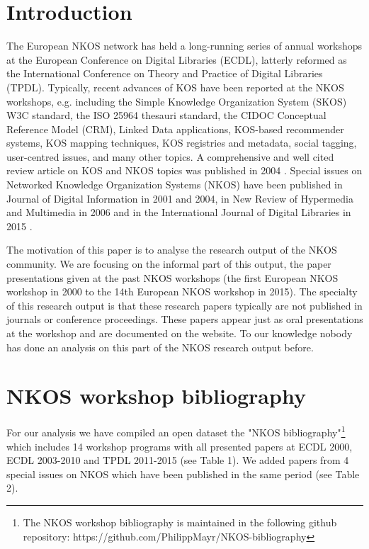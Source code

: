 \documentclass[runningheads,a4paper]{llncs}
\begin{document}
\section{Introduction}\label{intro}

The European NKOS network has held a long-running series of annual workshops at the European Conference on Digital Libraries (ECDL), latterly reformed as the International Conference on Theory and Practice of Digital Libraries (TPDL). 
Typically, recent advances of KOS have been reported at the NKOS workshops, e.g. including the Simple Knowledge Organization System (SKOS) W3C standard, the ISO 25964 thesauri standard, the CIDOC Conceptual Reference Model (CRM), Linked Data applications, KOS-based recommender systems, KOS mapping techniques, KOS registries and metadata, social tagging, user-centred issues, and many other topics. A comprehensive and well cited review article on KOS and NKOS topics was published in 2004 \cite{Zeng2004}. Special issues on Networked Knowledge Organization Systems (NKOS) have been published in Journal of Digital Information in 2001 and 2004, in New Review of Hypermedia and Multimedia in 2006 and in the International Journal of Digital Libraries in 2015 \cite{Mayr2016}. 

The motivation of this paper is to analyse the research output of the NKOS community. We are focusing on the informal part of this output, the paper presentations given at the past NKOS workshops (the first European NKOS workshop in 2000 to the 14th European NKOS workshop in 2015). The specialty of this research output is that these research papers typically are not published in journals or conference proceedings. These papers appear just as oral presentations at the workshop and are documented on the website. To our knowledge nobody has done an analysis on this part of the NKOS research output before. 



\section{NKOS workshop bibliography}\label{dataset}

For our analysis we have compiled an open dataset the "NKOS bibliography"\footnote{The NKOS workshop bibliography is maintained in the following github repository: https://github.com/PhilippMayr/NKOS-bibliography} which includes 14 workshop programs with all presented papers at ECDL 2000, ECDL 2003-2010 and TPDL 2011-2015 (see Table 1). We added papers from 4 special issues on NKOS which have been published in the same period (see Table 2). 
\end{document}
